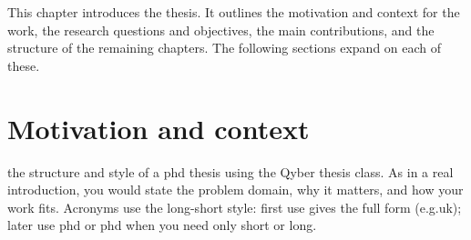 %

This chapter introduces the thesis. It outlines the motivation and context for the work, the research questions and objectives, the main contributions, and the structure of the remaining chapters. The following sections expand on each of these.


\section{Motivation and context}\label{sec:motivation}

 the structure and style of a \gls{phd} thesis using the Qyber thesis class. As in a real introduction, you would state the problem domain, why it matters, and how your work fits. Acronyms use the long-short style: first use gives the full form (e.g.\@ \gls{uk}); later use \acrshort{phd} or \acrlong{phd} when you need only short or long.

